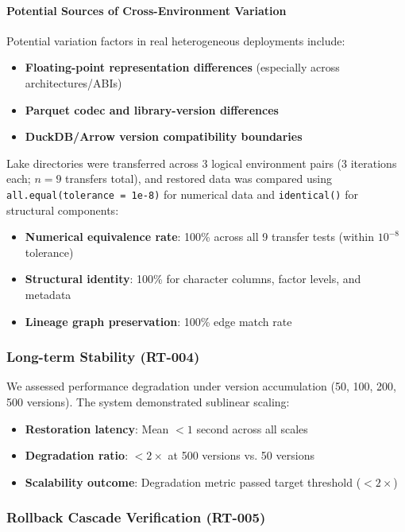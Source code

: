 \documentclass[11pt,a4paper]{article}
\begin{document}
\paragraph{Potential Sources of Cross-Environment Variation}
Potential variation factors in real heterogeneous deployments include:
\begin{itemize}
    \item \textbf{Floating-point representation differences} (especially across architectures/ABIs)
    \item \textbf{Parquet codec and library-version differences}
    \item \textbf{DuckDB/Arrow version compatibility boundaries}
\end{itemize}

Lake directories were transferred across 3 logical environment pairs (3 iterations each; $n=9$ transfers total), and restored data was compared using \texttt{all.equal(tolerance = 1e-8)} for numerical data and \texttt{identical()} for structural components:

\begin{itemize}
    \item \textbf{Numerical equivalence rate}: 100\% across all 9 transfer tests (within $10^{-8}$ tolerance)
    \item \textbf{Structural identity}: 100\% for character columns, factor levels, and metadata
    \item \textbf{Lineage graph preservation}: 100\% edge match rate
\end{itemize}

\subsubsection{Long-term Stability (RT-004)}

We assessed performance degradation under version accumulation (50, 100, 200, 500 versions). The system demonstrated sublinear scaling:

\begin{itemize}
    \item \textbf{Restoration latency}: Mean $< 1$ second across all scales
    \item \textbf{Degradation ratio}: $< 2\times$ at 500 versions vs. 50 versions
    \item \textbf{Scalability outcome}: Degradation metric passed target threshold ($<2\times$)
\end{itemize}

\subsubsection{Rollback Cascade Verification (RT-005)}
\end{document}
